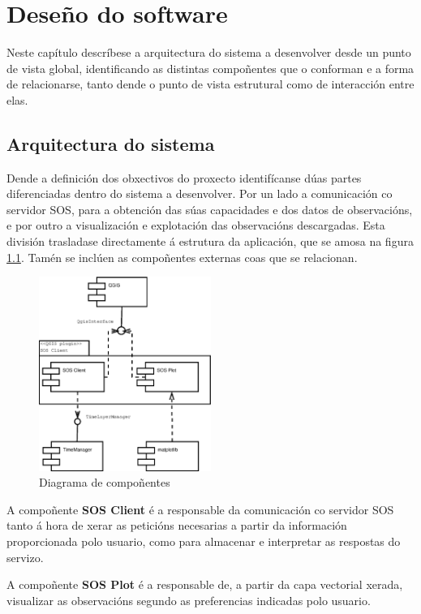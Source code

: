 \chapter{Deseño do software}
Neste capítulo descríbese a arquitectura do sistema a desenvolver desde un punto de vista global, identificando as distintas compoñentes que o conforman e a forma de relacionarse, tanto dende o punto de vista estrutural como de interacción entre elas.

\section{Arquitectura do sistema}
Dende a definición dos obxectivos do proxecto identifícanse dúas partes diferenciadas dentro do sistema a desenvolver. Por un lado a comunicación co servidor SOS, para a obtención das súas capacidades e dos datos de observacións, e por outro a visualización e explotación das observacións descargadas. Esta división trasladase directamente á estrutura da aplicación, que se amosa na figura \ref{fig:diaComponentes}. Tamén se inclúen as compoñentes externas coas que se relacionan.

\begin{figure}[hbtp]
 \centering
 \includegraphics[width=0.5\textwidth]{images/componentes.eps}
 \caption{Diagrama de compoñentes}
 \label{fig:diaComponentes}
\end{figure}

A compoñente \textbf{SOS Client} é a responsable da comunicación co servidor SOS tanto á hora de xerar as peticións necesarias a partir da información proporcionada polo usuario, como para almacenar e interpretar as respostas do servizo.

A compoñente \textbf{SOS Plot} é a responsable de, a partir da capa vectorial xerada, visualizar as observacións segundo as preferencias indicadas polo usuario.

